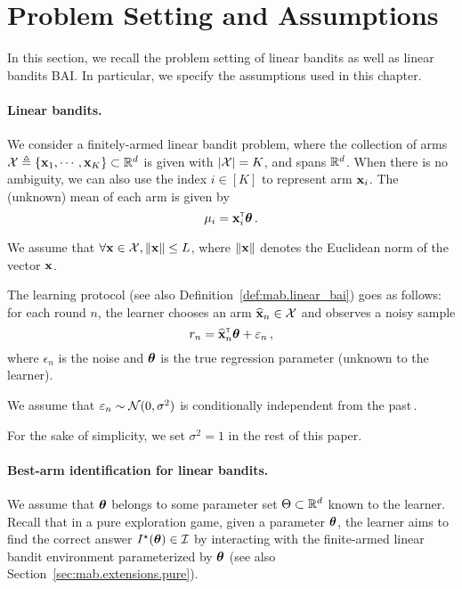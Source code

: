 \section{Problem Setting and Assumptions}\label{sec:lgc.formulation}

In this section, we recall the problem setting of linear bandits as well as linear bandits BAI. In particular, we specify the assumptions used in this chapter.

\paragraph{Linear bandits.}
We consider a finitely-armed linear bandit problem, where the collection of arms $\mathcal{X}\triangleq\{{\bf x}_1,\cdots,{\bf x}_K\}\subset \mathbb{R}^d$ is given with $|\mathcal{X}|=K$, and spans $\mathbb{R}^d$. When there is no ambiguity, we can also use the index $i\in[K]$ to represent arm ${\bf x}_i$. The (unknown) mean of each arm is given by
\[
    \mu_i = {\bf x}_i^\mathsf{\scriptscriptstyle T}{\boldsymbol \theta}\,.
\]

\begin{assumption}
\begin{leftbar}[assumptionbar]
    We assume that $\forall {\bf x}\in\mathcal{X}, \left\lVert{\bf x}\right\rVert\leq L$, where $\left\lVert{\bf x}\right\rVert$ denotes the Euclidean norm of the vector ${\bf x}$.
\end{leftbar}
\end{assumption}

The learning protocol (see also Definition~\ref{def:mab.linear_bai}) goes as follows: for each round $n$, the learner chooses an arm $\widehat{{\bf x}}_n\in\mathcal{X}$ and observes a noisy sample
\[
    r_n = \widehat{{\bf x}}_n^\mathsf{\scriptscriptstyle T}{\boldsymbol \theta} +\varepsilon_n\,,
\]
where $\epsilon_n$ is the noise and ${\boldsymbol \theta}$ is the true regression parameter (unknown to the learner).
\begin{assumption}
\begin{leftbar}[assumptionbar]
    We assume that $\varepsilon_n \sim \mathcal{N}(0,\sigma^2)$ is conditionally independent from the past\,.
\end{leftbar}
\end{assumption}
For the sake of simplicity, we set $\sigma^2 = 1$ in the rest of this paper.

\paragraph{Best-arm identification for linear bandits.}
We assume that ${\boldsymbol \theta}$ belongs to some parameter set $\Theta\subset\mathbb{R}^d$ known to the learner. Recall that in a pure exploration game, given a parameter ${\boldsymbol \theta}$, the learner aims to find the correct answer $I^\star({\boldsymbol \theta})\in\mathcal{I}$ by interacting with the finite-armed linear bandit environment parameterized by ${\boldsymbol \theta}$ (see also Section~\ref{sec:mab.extensions.pure}).

